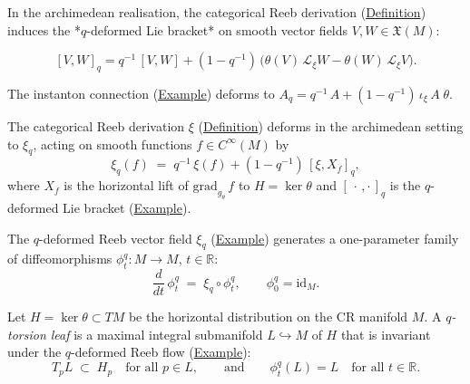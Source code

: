 \begin{example}
  \label{ex:q-lie-bracket}
In the archimedean realisation, the categorical Reeb derivation
(\hyperref[def:categorical-reeb]{Definition}) induces the *$q$-deformed
Lie bracket* on smooth vector fields $V, W \in \mathfrak{X}(M)$:

\[
[V, W]_q
  = q^{-1}\,[V, W]
        + (1 - q^{-1})\,\bigl(\theta(V)\,\mathcal{L}_\xi W
                              - \theta(W)\,\mathcal{L}_\xi V\bigr).
\]
\end{example}

\begin{example}
  \label{ex:q-connection}
The instanton connection (\hyperref[ex:instanton]{Example}) deforms to
$A_q = q^{-1}\,A + (1 - q^{-1})\,\iota_\xi\,A\;\theta$.
\end{example}

\begin{example}
  \label{ex:q-reeb-vector-field}
The categorical Reeb derivation $\xi$
(\hyperref[def:categorical-reeb]{Definition}) deforms in the archimedean
setting to $\xi_q$, acting on smooth functions $f \in C^\infty(M)$ by
\[
\xi_q(f) \;=\; q^{-1}\,\xi(f) + (1 - q^{-1})\,[\xi, X_f]_q,
\]
where $X_f$ is the horizontal lift of $\mathrm{grad}_{g_\theta}\,f$ to
$H = \ker\theta$ and $[\,\cdot\,,\cdot\,]_q$ is the $q$-deformed Lie
bracket (\hyperref[ex:q-lie-bracket]{Example}).
\end{example}

\begin{example}
  \label{ex:q-reeb-flow}
The $q$-deformed Reeb vector field $\xi_q$
(\hyperref[ex:q-reeb-vector-field]{Example}) generates a one-parameter
family of diffeomorphisms
$\phi_t^q \colon M \to M$, $t \in \mathbb{R}$:
\[
\frac{d}{dt}\,\phi_t^q \;=\; \xi_q \circ \phi_t^q,
  \qquad \phi_0^q = \mathrm{id}_M.
\]
\end{example}

\begin{example}
  \label{ex:q-torsion-leaf}
Let $H = \ker\theta \subset TM$ be the horizontal distribution on the
CR manifold $M$.  A \emph{$q$-torsion leaf} is a maximal integral
submanifold $L \hookrightarrow M$ of $H$ that is invariant under the
$q$-deformed Reeb flow (\hyperref[ex:q-reeb-flow]{Example}):
\[
T_p L \;\subset\; H_p
  \quad\text{for all } p \in L,
  \qquad\text{and}\qquad
  \phi_t^q(L) = L
  \quad\text{for all } t \in \mathbb{R}.
\]
\end{example}

